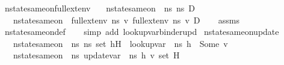\begin{isabellebody}
\isamarkupfalse%
%
\endisatagproof
{\isafoldproof}%
%
\isadelimproof
\isanewline
%
\endisadelimproof
\isanewline
{}\isamarkupfalse%
\ nstate{\isacharunderscore}{\kern0pt}same{\isacharunderscore}{\kern0pt}on{\isacharunderscore}{\kern0pt}full{\isacharunderscore}{\kern0pt}ext{\isacharunderscore}{\kern0pt}env{\isacharcolon}{\kern0pt}\isanewline
\ \ \ {\isachardoublequoteopen}nstate{\isacharunderscore}{\kern0pt}same{\isacharunderscore}{\kern0pt}on\ {\isasymLambda}\ ns{}\ ns{}\ D{\isachardoublequoteclose}\isanewline
\ \ \ {\isachardoublequoteopen}nstate{\isacharunderscore}{\kern0pt}same{\isacharunderscore}{\kern0pt}on\ {\isasymLambda}\ {\isacharparenleft}{\kern0pt}full{\isacharunderscore}{\kern0pt}ext{\isacharunderscore}{\kern0pt}env\ ns{}\ v{\isacharparenright}{\kern0pt}\ {\isacharparenleft}{\kern0pt}full{\isacharunderscore}{\kern0pt}ext{\isacharunderscore}{\kern0pt}env\ ns{}\ v{\isacharparenright}{\kern0pt}\ D{\isachardoublequoteclose}\isanewline
%
\isadelimproof
\ \ %
\endisadelimproof
%
\isatagproof
{}\isamarkupfalse%
\ assms\isanewline
\ \ \isamarkupfalse%
\ nstate{\isacharunderscore}{\kern0pt}same{\isacharunderscore}{\kern0pt}on{\isacharunderscore}{\kern0pt}def\isanewline
\ \ \isamarkupfalse%
\ {\isacharparenleft}{\kern0pt}simp\ add{\isacharcolon}{\kern0pt}\ lookup{\isacharunderscore}{\kern0pt}var{\isacharunderscore}{\kern0pt}binder{\isacharunderscore}{\kern0pt}upd{\isacharparenright}{\kern0pt}%
\endisatagproof
{\isafoldproof}%
%
\isadelimproof
\isanewline
%
\endisadelimproof
\isanewline
{}\isamarkupfalse%
\ nstate{\isacharunderscore}{\kern0pt}same{\isacharunderscore}{\kern0pt}on{\isacharunderscore}{\kern0pt}update{\isacharcolon}{\kern0pt}\isanewline
\ \ \ {\isachardoublequoteopen}nstate{\isacharunderscore}{\kern0pt}same{\isacharunderscore}{\kern0pt}on\ {\isasymLambda}\ ns{}\ ns{}\ {\isacharparenleft}{\kern0pt}set\ {\isacharparenleft}{\kern0pt}h{\isacharhash}{\kern0pt}H{\isacharparenright}{\kern0pt}{\isacharparenright}{\kern0pt}{\isachardoublequoteclose}\ \ {\isachardoublequoteopen}lookup{\isacharunderscore}{\kern0pt}var\ {\isasymLambda}\ ns{}\ h\ {\isacharequal}{\kern0pt}\ Some\ v{\isachardoublequoteclose}\isanewline
\ \ \ {\isachardoublequoteopen}nstate{\isacharunderscore}{\kern0pt}same{\isacharunderscore}{\kern0pt}on\ {\isasymLambda}\ ns{}\ {\isacharparenleft}{\kern0pt}update{\isacharunderscore}{\kern0pt}var\ {\isasymLambda}\ ns{}\ h\ v{\isacharparenright}{\kern0pt}\ {\isacharparenleft}{\kern0pt}set\ H{\isacharparenright}{\kern0pt}{\isachardoublequoteclose}\isanewline

\end{isabellebody}
